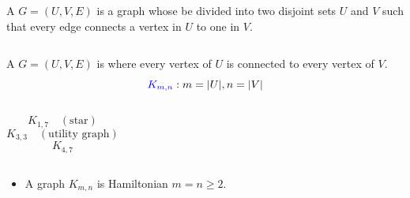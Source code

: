 \begin{frame}{}
  \begin{definition}
    A  $G = (U, V, E)$ is a graph
    whose   be divided into
    two disjoint sets $U$ and $V$ such that
    every edge connects a vertex in $U$ to one in $V$.
  \end{definition}

  \begin{columns}
      \pause
  \end{columns}
\end{frame}

\begin{frame}{}
  \begin{definition}
    A  $G = (U, V, E)$ is 
    where every vertex of $U$ is connected to every vertex of $V$.
    \[
      \textcolor{blue}{K_{m, n}}: m = |U|, n = |V|
    \]
  \end{definition}

  \pause
  \begin{columns}
      \[
        K_{1, 7} \quad (\text{star})
      \]
      \[
        K_{3, 3} \quad (\text{utility graph})
      \]
      \[
        K_{4, 7}
      \]
  \end{columns}
\end{frame}

\begin{frame}{}
  \begin{exampleblock}{}
    \begin{itemize}
      \item A  graph $K_{m, n}$ is Hamiltonian
         $m = n \ge 2$.
    \end{itemize}
  \end{exampleblock}

  \pause
  \vspace{0.60cm}
  \begin{columns}
  \end{columns}
\end{frame}

